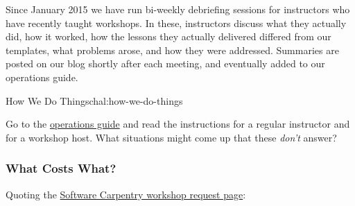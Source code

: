 Since January 2015 we have run bi-weekly debriefing sessions for
instructors who have recently taught workshops. In these, instructors
discuss what they actually did, how it worked, how the lessons they
actually delivered differed from our templates, what problems arose, and
how they were addressed. Summaries are posted on our blog shortly after
each meeting, and eventually added to our operations guide.

\begin{challenge}{How We Do Things}{chal:how-we-do-things}

Go to the
\href{http://software-carpentry.org/workshops/operations/}{operations
guide} and read the instructions for a regular instructor and for a
workshop host. What situations might come up that these \emph{don't}
answer?
\end{challenge}

\subsubsection{What Costs What?}\label{what-costs-what}

Quoting the \href{http://software-carpentry.org/workshops/request/}{Software
Carpentry workshop request page}:


